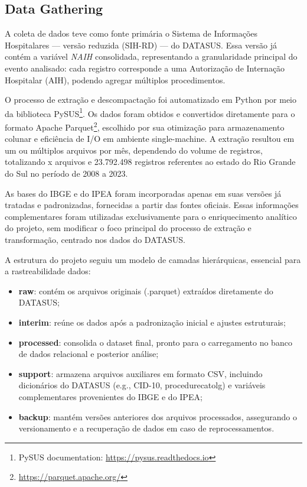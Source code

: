 \documentclass[sigconf,natbib=false]{acmart}
\begin{document}
\subsection{Data Gathering}

A coleta de dados teve como fonte primária o Sistema de Informações Hospitalares — versão reduzida (SIH-RD) — do DATASUS. Essa versão já contém a variável \textit{NAIH} consolidada, representando a granularidade principal do evento analisado: cada registro corresponde a uma Autorização de Internação Hospitalar (AIH), podendo agregar múltiplos procedimentos.

O processo de extração e descompactação foi automatizado em Python por meio da biblioteca PySUS\footnote{PySUS documentation: \url{https://pysus.readthedocs.io}}. Os dados foram obtidos e convertidos diretamente para o formato Apache Parquet\footnote{\url{https://parquet.apache.org/}}, escolhido por sua otimização para armazenamento colunar e eficiência de I/O em ambiente single-machine. A extração resultou em um ou múltiplos arquivos por mês, dependendo do volume de registros, totalizando x arquivos e 23.792.498 registros referentes ao estado do Rio Grande do Sul no período de 2008 a 2023.

As bases do IBGE e do IPEA foram incorporadas apenas em suas versões já tratadas e padronizadas, fornecidas a partir das fontes oficiais. Essas informações complementares foram utilizadas exclusivamente para o enriquecimento analítico do projeto, sem modificar o foco principal do processo de extração e transformação, centrado nos dados do DATASUS.

A estrutura do projeto seguiu um modelo de camadas hierárquicas, essencial para a rastreabilidade dados:


\begin{itemize}
    \item \textbf{raw}: contém os arquivos originais (.parquet) extraídos diretamente do DATASUS;
    \item \textbf{interim}: reúne os dados após a padronização inicial e ajustes estruturais;
    \item \textbf{processed}: consolida o dataset final, pronto para o carregamento no banco de dados relacional e posterior análise;
    \item \textbf{support}: armazena arquivos auxiliares em formato CSV, incluindo dicionários do DATASUS (e.g., CID-10, procedurecatolg) e variáveis complementares provenientes do IBGE e do IPEA;
    \item \textbf{backup}: mantém versões anteriores dos arquivos processados, assegurando o versionamento e a recuperação de dados em caso de reprocessamentos.
\end{itemize}
\end{document}
